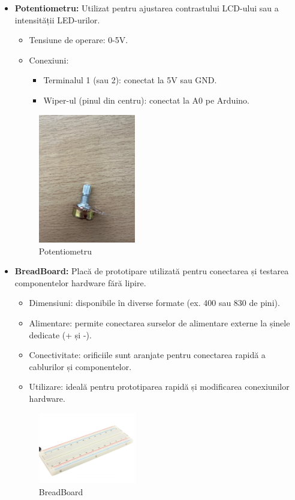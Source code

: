 \documentclass{report}
\begin{document}
\begin{itemize}
    \item \textbf{Potentiometru:} Utilizat pentru ajustarea contrastului LCD-ului sau a intensității LED-urilor.
    \begin{itemize}
    \vspace*{1cm}
        \item Tensiune de operare: 0-5V.
        \item Conexiuni:
            \begin{itemize}
                \item Terminalul 1 (sau 2): conectat la 5V sau GND.
                \item Wiper-ul (pinul din centru): conectat la A0 pe Arduino.
            \end{itemize}
    \end{itemize}
    \begin{figure}[H]
    \centering
    \includegraphics[width=0.4\textwidth]{potentiometru.jpg}
    \caption{Potentiometru}
    \label{fig:potentiometru}
\end{figure}
    \item \textbf{BreadBoard:} Placă de prototipare utilizată pentru conectarea și testarea componentelor hardware fără lipire.
    \begin{itemize}
        \item Dimensiuni: disponibile în diverse formate (ex. 400 sau 830 de pini).
        \item Alimentare: permite conectarea surselor de alimentare externe la șinele dedicate (+ și -).
        \item Conectivitate: orificiile sunt aranjate pentru conectarea rapidă a cablurilor și componentelor.
        \item Utilizare: ideală pentru prototiparea rapidă și modificarea conexiunilor hardware.
    \end{itemize}
    \begin{figure}[H]
    \centering
    \includegraphics[width=0.4\textwidth]{breadboard.png}
    \caption{BreadBoard}
    \label{fig:breadboard}
\end{figure}


\end{itemize}
\end{document}
